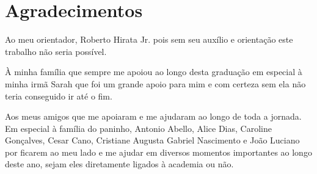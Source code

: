 \chapter*{Agradecimentos}

Ao meu orientador, Roberto Hirata Jr. pois sem seu auxílio e orientação este trabalho não
seria possível.

À minha família que sempre me apoiou ao longo desta graduação em especial à minha irmã Sarah
que foi um grande apoio para mim e com certeza sem ela não teria conseguido ir até o fim.

Aos meus amigos que me apoiaram e me ajudaram ao longo de toda a jornada. Em especial
à família do paninho, Antonio Abello, Alice Dias, Caroline Gonçalves, Cesar Cano, Cristiane Augusta
Gabriel Nascimento e João Luciano por ficarem ao meu lado e me ajudar em diversos momentos importantes ao longo deste ano, sejam eles diretamente ligados à academia ou não.